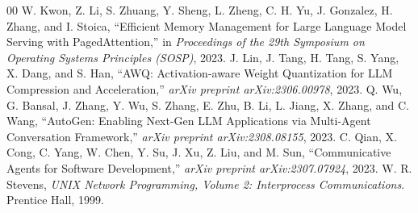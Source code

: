 \documentclass[conference]{IEEEtran}
\begin{document}
\begin{thebibliography}{00}
 W. Kwon, Z. Li, S. Zhuang, Y. Sheng, L. Zheng, C. H. Yu, J. Gonzalez, H. Zhang, and I. Stoica, ``Efficient Memory Management for Large Language Model Serving with PagedAttention,'' in \emph{Proceedings of the 29th Symposium on Operating Systems Principles (SOSP)}, 2023.
 J. Lin, J. Tang, H. Tang, S. Yang, X. Dang, and S. Han, ``AWQ: Activation-aware Weight Quantization for LLM Compression and Acceleration,'' \emph{arXiv preprint arXiv:2306.00978}, 2023.
 Q. Wu, G. Bansal, J. Zhang, Y. Wu, S. Zhang, E. Zhu, B. Li, L. Jiang, X. Zhang, and C. Wang, ``AutoGen: Enabling Next-Gen LLM Applications via Multi-Agent Conversation Framework,'' \emph{arXiv preprint arXiv:2308.08155}, 2023.
 C. Qian, X. Cong, C. Yang, W. Chen, Y. Su, J. Xu, Z. Liu, and M. Sun, ``Communicative Agents for Software Development,'' \emph{arXiv preprint arXiv:2307.07924}, 2023.
 W. R. Stevens, \emph{UNIX Network Programming, Volume 2: Interprocess Communications}. Prentice Hall, 1999.
\end{thebibliography}
\end{document}

